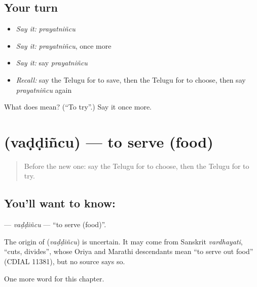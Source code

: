 \subsection*{Your turn}
\begin{itemize}
\raggedright
  \item \emph{Say it:} \emph{prayatniñcu}
  \item \emph{Say it:} \emph{prayatniñcu}, once more
  \item \emph{Say it:} say \emph{prayatniñcu}
  \item \emph{Recall:} say the Telugu for to save, then the Telugu for to choose, then say \emph{prayatniñcu} again
\end{itemize}

\begin{tcolorbox}[breakable,colback=teal!4,colframe=teal!35!black,title={Before you move on}]
What does  mean? (\textquotedblleft{}To try\textquotedblright{}.) Say it once more.
\end{tcolorbox}
\section[\texorpdfstring{\te{వడ్డించు} (vaḍḍiñcu)}{వడ్డించు (vaḍḍiñcu)}]{ (vaḍḍiñcu) — to serve (food)}

\label{lesson:TE-C200-vaddincu}



\begin{quote}
Before the new one: say the Telugu for to choose, then the Telugu for to try.
\end{quote}

\subsection*{You'll want to know: }
\textbf{} — \emph{vaḍḍiñcu} — \textquotedblleft{}to serve (food)\textquotedblright{}.

\begin{cousinweb}
The origin of \textbf{} (\emph{vaḍḍiñcu}) is uncertain. It may come from Sanskrit \emph{vardhayati}, \textquotedblleft{}cuts, divides\textquotedblright{}, whose Oriya and Marathi descendants mean \textquotedblleft{}to serve out food\textquotedblright{} (CDIAL 11381), but no source says so.
\end{cousinweb}

\begin{grammarlens}[title={What you've built}]
One more word for this chapter.
\end{grammarlens}


